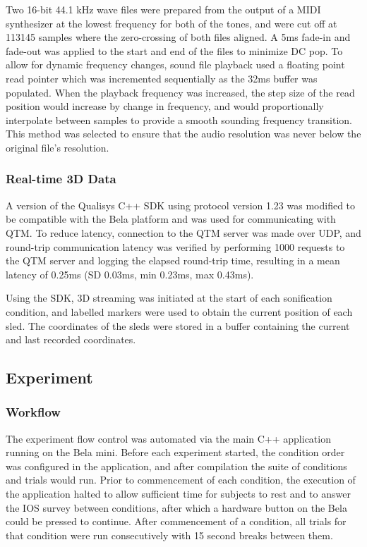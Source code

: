 \documentclass[10pt,a4paper,onecolumn]{article}
\begin{document}
Two 16-bit 44.1 kHz wave files were prepared from the output of a MIDI synthesizer at the lowest frequency for both of the tones, and were cut off at 113145 samples where the zero-crossing of both files aligned. A 5ms fade-in and fade-out was applied to the start and end of the files to minimize DC pop. To allow for dynamic frequency changes, sound file playback used a floating point read pointer which was incremented sequentially as the 32ms buffer was populated. When the playback frequency was increased, the step size of the read position would increase by change in frequency, and would proportionally interpolate between samples to provide a smooth sounding frequency transition. This method was selected to ensure that the audio resolution was never below the original file's resolution.

\hypertarget{real-time-3d-data}{%
\subsubsection{Real-time 3D Data}\label{real-time-3d-data}}

A version of the Qualisys C++ SDK using protocol version 1.23 was modified to be compatible with the Bela platform and was used for communicating with QTM. To reduce latency, connection to the QTM server was made over UDP, and round-trip communication latency was verified by performing 1000 requests to the QTM server and logging the elapsed round-trip time, resulting in a mean latency of 0.25ms (SD 0.03ms, min 0.23ms, max 0.43ms).

Using the SDK, 3D streaming was initiated at the start of each sonification condition, and labelled markers were used to obtain the current position of each sled. The coordinates of the sleds were stored in a buffer containing the current and last recorded coordinates.

\hypertarget{experiment}{%
\subsection{Experiment}\label{experiment}}

\hypertarget{workflow}{%
\subsubsection{Workflow}\label{workflow}}

The experiment flow control was automated via the main C++ application running on the Bela mini. Before each experiment started, the condition order was configured in the application, and after compilation the suite of conditions and trials would run. Prior to commencement of each condition, the execution of the application halted to allow sufficient time for subjects to rest and to answer the IOS survey between conditions, after which a hardware button on the Bela could be pressed to continue. After commencement of a condition, all trials for that condition were run consecutively with 15 second breaks between them.
\end{document}
